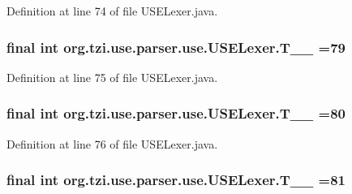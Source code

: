 Definition at line 74 of file U\-S\-E\-Lexer.\-java.

\hypertarget{classorg_1_1tzi_1_1use_1_1parser_1_1use_1_1_u_s_e_lexer_a96cfbf7e830e2537eb8b6b181bb0a4eb}{
\subsubsection[{T\-\_\-\-\_\-79}]{\setlength{\rightskip}{0pt plus 5cm}final int org.\-tzi.\-use.\-parser.\-use.\-U\-S\-E\-Lexer.\-T\-\_\-\-\_ =79\hspace{0.3cm}{\ttfamily [static]}}}\label{classorg_1_1tzi_1_1use_1_1parser_1_1use_1_1_u_s_e_lexer_a96cfbf7e830e2537eb8b6b181bb0a4eb}


Definition at line 75 of file U\-S\-E\-Lexer.\-java.

\hypertarget{classorg_1_1tzi_1_1use_1_1parser_1_1use_1_1_u_s_e_lexer_ab5ec972733dd41227944e2be5cabcc68}{
\subsubsection[{T\-\_\-\-\_\-80}]{\setlength{\rightskip}{0pt plus 5cm}final int org.\-tzi.\-use.\-parser.\-use.\-U\-S\-E\-Lexer.\-T\-\_\-\-\_ =80\hspace{0.3cm}{\ttfamily [static]}}}\label{classorg_1_1tzi_1_1use_1_1parser_1_1use_1_1_u_s_e_lexer_ab5ec972733dd41227944e2be5cabcc68}


Definition at line 76 of file U\-S\-E\-Lexer.\-java.

\hypertarget{classorg_1_1tzi_1_1use_1_1parser_1_1use_1_1_u_s_e_lexer_a99c941cabbce2e2dcc016238b3e9ffb2}{
\subsubsection[{T\-\_\-\-\_\-81}]{\setlength{\rightskip}{0pt plus 5cm}final int org.\-tzi.\-use.\-parser.\-use.\-U\-S\-E\-Lexer.\-T\-\_\-\-\_ =81\hspace{0.3cm}{\ttfamily [static]}}}\label{classorg_1_1tzi_1_1use_1_1parser_1_1use_1_1_u_s_e_lexer_a99c941cabbce2e2dcc016238b3e9ffb2}


